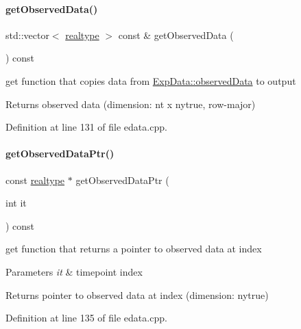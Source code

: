 \paragraph{\texorpdfstring{get\+Observed\+Data()}{getObservedData()}}
{\footnotesize\ttfamily std\+::vector$<$ \mbox{\hyperlink{namespaceamici_a1bdce28051d6a53868f7ccbf5f2c14a3}{realtype}} $>$ const  \& get\+Observed\+Data (\begin{DoxyParamCaption}{ }\end{DoxyParamCaption}) const}

get function that copies data from \mbox{\hyperlink{classamici_1_1_exp_data_a6acedf749a3c5e4c4dcbc822f58a565d}{Exp\+Data\+::observed\+Data}} to output

\begin{DoxyReturn}{Returns}
observed data (dimension\+: nt x nytrue, row-\/major) 
\end{DoxyReturn}


Definition at line 131 of file edata.\+cpp.

\mbox{\label{classamici_1_1_exp_data_a8839910b831f8c55976d880df081fb3e}} 
\paragraph{\texorpdfstring{get\+Observed\+Data\+Ptr()}{getObservedDataPtr()}}
{\footnotesize\ttfamily const \mbox{\hyperlink{namespaceamici_a1bdce28051d6a53868f7ccbf5f2c14a3}{realtype}} $\ast$ get\+Observed\+Data\+Ptr (\begin{DoxyParamCaption}\item[{int}]{it }\end{DoxyParamCaption}) const}

get function that returns a pointer to observed data at index


\begin{DoxyParams}{Parameters}
{\em it} & timepoint index \\
\hline
\end{DoxyParams}
\begin{DoxyReturn}{Returns}
pointer to observed data at index (dimension\+: nytrue) 
\end{DoxyReturn}


Definition at line 135 of file edata.\+cpp.

